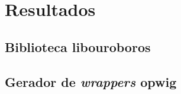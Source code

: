 \chapter{Resultados}
\label{sec:resultados}
\cite{xtr:00}

\section{Biblioteca \textbf{libouroboros}}


\section{Gerador de \emph{wrappers} \textbf{opwig}}
